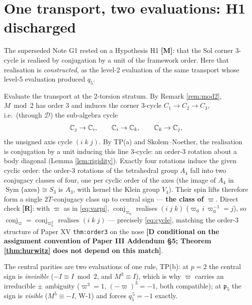 \documentclass[11pt,a4paper]{article}
\theoremstyle{plain}
\theoremstyle{definition}
\theoremstyle{remark}
\newcommand{\pfive}{\mathfrak{p}_5}
\newcommand{\conj}[1]{\operatorname{conj}_{#1}}
\newcommand{\rtag}[1]{\textnormal{\textbf{[#1]}}}
\DeclareMathOperator{\Sym}{Sym}
\begin{document}
\section{One transport, two evaluations: H1 discharged}\label{sec:twoeval}

The superseded Note G1 rested on a Hypothesis H1 \rtag{M}: that the Sol corner 3-cycle is realised by conjugation by a unit of the framework order. Here that realisation is \emph{constructed}, as the level-2 evaluation of the same transport whose level-5 evaluation produced $q_5$.

Evaluate the transport at the 2-torsion stratum. By Remark \ref{rem:mod2}, $M \bmod 2$ has order 3 and induces the corner 3-cycle $C_1 \to C_2 \to C_3$, i.e.\ (through $\mathcal{D}$) the sub-algebra cycle
\begin{equation}\label{eq:cycle}
\mathbb{C}_j \to \mathbb{C}_i, \qquad \mathbb{C}_i \to \mathbb{C}_k, \qquad \mathbb{C}_k \to \mathbb{C}_j,
\end{equation}
the unsigned axis cycle $(i\;k\;j)$. By TP(a) and Skolem--Noether, the realisation is conjugation by a unit inducing this line 3-cycle: an order-3 rotation about a body diagonal (Lemma \ref{lem:rigidity}). Exactly four rotations induce the given cyclic order: the order-3 rotations of the tetrahedral group $A_4$ fall into two conjugacy classes of four, one per cyclic order of the axes (the image of $A_4$ in $\Sym\{\text{axes}\} \cong S_3$ is $A_3$, with kernel the Klein group $V_4$). Their spin lifts therefore form a single $2T$-conjugacy class up to central sign --- \textbf{the class of $\varpi$}. Direct check \rtag{R}: with $\varpi$ as in \eqref{eq:varpi}, $\conj{\varpi_0}$ realises $(i\;j\;k)$ ($\varpi_0\, i\, \varpi_0^{-1} = j$), so $\conj{\varpi} = \conj{\varpi_0^2}$ realises $(i\;k\;j)$ --- precisely \eqref{eq:cycle}, matching the order-3 structure of Paper XV \texttt{thm:order3} on the nose \rtag{D conditional on the assignment convention of Paper III Addendum \S5; Theorem \ref{thm:hurwitz} does not depend on this match}.

The central parities are two evaluations of one rule, TP(b): at $p = 2$ the central sign is \emph{invisible} ($-I \equiv I \bmod 2$, and $M^3 \equiv I$), which is why $\varpi$ carries an irreducible $\pm$ ambiguity ($\varpi^3 = 1$, $(-\varpi)^3 = -1$, both compatible); at $\pfive$ the sign is \emph{visible} ($M^5 \equiv -I$, W-1) and forces $q_5^{\,5} = -1$ exactly.
\end{document}
